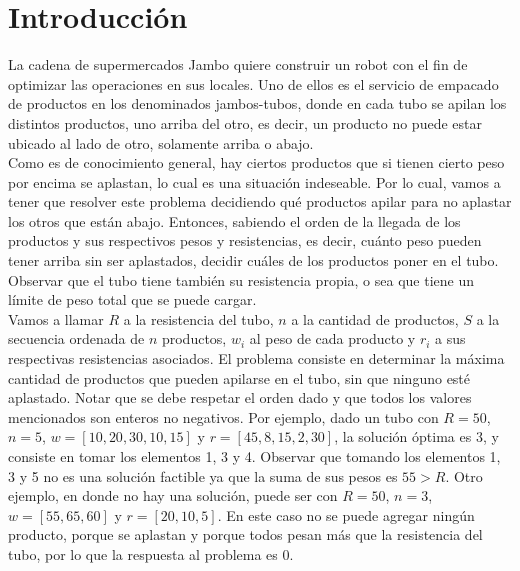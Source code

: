 \documentclass[10pt,a4paper]{article}
\begin{document}

\fecha{}



\maketitle

\thispagestyle{empty}

\newpage

\setcounter{page}{1}

\section{Introducción} \label{sec:introduccion}

La cadena de supermercados Jambo quiere construir un robot con el fin de optimizar las operaciones en sus locales. Uno de ellos es el servicio de empacado de productos en los denominados jambos-tubos, donde en cada tubo se apilan los distintos productos, uno arriba del otro, es decir, un producto no puede estar ubicado al lado de otro, solamente arriba o abajo.\\

Como es de conocimiento general, hay ciertos productos que si tienen cierto peso por encima se aplastan, lo cual es una situaci\'on indeseable. Por lo cual, vamos a tener que resolver este problema decidiendo qu\'e productos apilar para no aplastar los otros que están abajo. Entonces, sabiendo el orden de la llegada de los productos y sus respectivos pesos y resistencias, es decir, cu\'anto peso pueden tener arriba sin ser aplastados, decidir cu\'ales de los productos poner en el tubo. Observar que el tubo tiene tambi\'en su resistencia propia, o sea que tiene un l\'imite de peso total que se puede cargar.\\

Vamos a llamar $R$ a la resistencia del tubo, $n$ a la cantidad de productos, $S$ a la secuencia ordenada de $n$ productos, $w_i$ al peso de cada producto y $r_i$ a sus respectivas resistencias asociados. El problema consiste en determinar la máxima cantidad de productos que pueden apilarse en el tubo, sin que ninguno esté aplastado. Notar que se debe respetar el orden dado y que todos los valores mencionados son enteros no negativos. Por ejemplo, dado un tubo con $R = 50$, $n = 5$, $w = [10, 20, 30, 10, 15]$ y $r = [45, 8, 15, 2, 30]$, la soluci\'on \'optima es 3, y consiste en tomar los elementos 1, 3 y 4. Observar que tomando los elementos 1, 3 y 5 no es una soluci\'on factible ya que la suma de sus pesos es $55 > R$. Otro ejemplo, en donde no hay una solución, puede ser con  $R = 50$, $n = 3$, $w = [55, 65, 60]$ y $r = [20, 10, 5]$. En este caso no se puede agregar ningún producto, porque se aplastan y porque todos pesan más que la resistencia del tubo, por lo que la respuesta al problema es $0$.     \\
\end{document}
